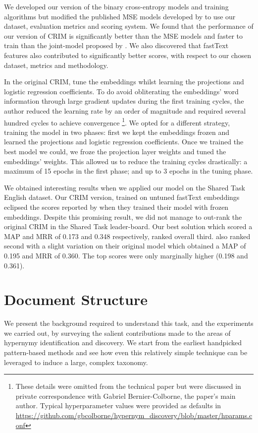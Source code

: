 We developed our version of the binary cross-entropy models and training algorithms but modified the published \ac{MSE} models developed by \citeauthor{ustalov2017negative} to use our dataset, evaluation metrics and scoring system.  We found that the performance of our version of CRIM is significantly better than the \ac{MSE} models and faster to train than the joint-model proposed by \citet{yamane2016distributional}.  We also discovered that fastText features also contributed to significantly better scores, with respect to our chosen dataset, metrics and methodology.

In the original CRIM, \citet{bernier2018crim} tune the embeddings whilst learning the projections and logistic regression coefficients.  To do avoid obliterating the embeddings' word information through large gradient updates during the first training cycles, the author reduced the learning rate by an order of magnitude and required several hundred cycles to achieve convergence \footnote{These details were omitted from the technical paper but were discussed in private correspondence with Gabriel Bernier-Colborne, the paper's main author.  Typical hyperparameter values were provided as defaults in \url{https://github.com/gbcolborne/hypernym_discovery/blob/master/hparams.conf}}.  We opted for a different strategy, training the model in two phases: first we kept the embeddings frozen and learned the projections and logistic regression coefficients.  Once we trained the best model we could, we froze the projection layer weights and tuned the embeddings' weights.  This allowed us to reduce the training cycles drastically: a maximum of 15 epochs in the first phase; and up to 3 epochs in the tuning phase.  

We obtained interesting results when we applied our model on the Shared Task English dataset. Our CRIM version, trained on untuned fastText embeddings eclipsed the scores reported by \citet{bernier2018crim} when they trained their model with frozen embeddings.  Despite this promising result, we did not manage to out-rank the original CRIM in the Shared Task leader-board.  Our best solution which scored a \ac{MAP} and \ac{MRR} of 0.173 and 0.348 respectively, ranked overall third.
\citeauthor{bernier2018crim} also ranked second with a slight variation on their original model which obtained a \ac{MAP} of 0.195 and \ac{MRR} of 0.360.  The top scores were only marginally higher (0.198 and 0.361).

\section{Document Structure}
We present the background required to understand this task, and the experiments we carried out, by surveying the salient contributions made to the areas of hypernymy identification and discovery.   We start from the earliest handpicked pattern-based methods and see how even this relatively simple technique can be leveraged to induce a large, complex taxonomy.  

